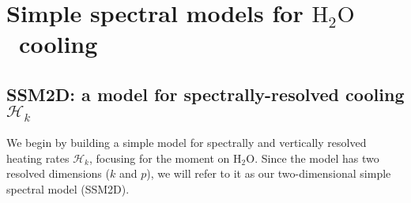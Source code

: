 \documentclass{ametsoc}
\newcommand{\eqnref}[1]{(\ref{#1})}
\newcommand{\der}[2]{\ensuremath{\frac{d #1}{d #2}}}
\newcommand{\partialder}[2]{\ensuremath{\frac{\partial #1}{\partial #2}}}
\newcommand{\ppp}{\ensuremath{\partial_p}}
\newcommand{\htwo}{\ensuremath{\mathrm{H_2O}}}
\newcommand{\trans}{\ensuremath{\mathcal{T}}}
\newcommand{\ch}{\ensuremath{\mathcal{H}}}
\newcommand{\chk}{\ensuremath{\ch_k}}
\newcommand{\CTS}{\ensuremath{\mathrm{CTS}}}
\begin{document}
% 
\section{Simple spectral models for  \htwo\ cooling} \label{sec_h2o_theory}

\subsection{SSM2D: a model for spectrally-resolved cooling \chk} \label{sec_h2o_spectral}
We begin by building a simple model for spectrally and vertically resolved heating rates \chk, focusing for the moment on \htwo. Since the model has two resolved dimensions ($k$ and $p$), we will refer to it as our two-dimensional simple spectral model (SSM2D).
\end{document}
